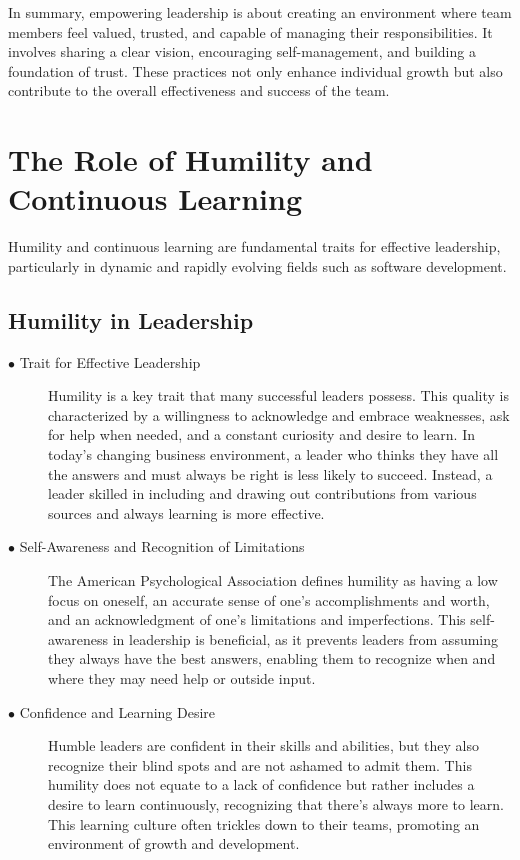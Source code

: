 \documentclass[runningheads]{llncs}
\begin{document}
In summary, empowering leadership is about creating an environment where team members feel valued, trusted, and capable of managing their responsibilities. It involves sharing a clear vision, encouraging self-management, and building a foundation of trust. These practices not only enhance individual growth but also contribute to the overall effectiveness and success of the team.



\section{The Role of Humility and Continuous Learning}

Humility and continuous learning are fundamental traits for effective leadership, particularly in dynamic and rapidly evolving fields such as software development.

\subsection{Humility in Leadership}
\begin{description}

 \item [$\bullet$ Trait for Effective Leadership] Humility is a key trait that many successful leaders possess. This quality is characterized by a willingness to acknowledge and embrace weaknesses, ask for help when needed, and a constant curiosity and desire to learn. In today's changing business environment, a leader who thinks they have all the answers and must always be right is less likely to succeed. Instead, a leader skilled in including and drawing out contributions from various sources and always learning is more effective.\\

 \item [$\bullet$ Self-Awareness and Recognition of Limitations] The American Psychological Association defines humility as having a low focus on oneself, an accurate sense of one's accomplishments and worth, and an acknowledgment of one's limitations and imperfections. This self-awareness in leadership is beneficial, as it prevents leaders from assuming they always have the best answers, enabling them to recognize when and where they may need help or outside input.\\

 \item [$\bullet$ Confidence and Learning Desire] Humble leaders are confident in their skills and abilities, but they also recognize their blind spots and are not ashamed to admit them. This humility does not equate to a lack of confidence but rather includes a desire to learn continuously, recognizing that there's always more to learn. This learning culture often trickles down to their teams, promoting an environment of growth and development.\\
\end{description}
\end{document}
